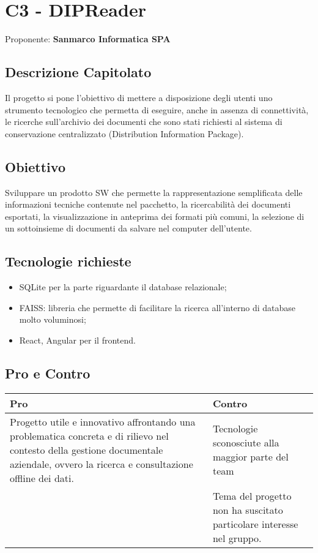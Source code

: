 \documentclass[a4paper,12pt]{article}
\begin{document}
\section{C3 - DIPReader}{
    Proponente: \textbf{Sanmarco Informatica SPA}
    \subsection*{Descrizione Capitolato}{
        Il progetto si pone l'obiettivo di mettere a disposizione degli utenti uno strumento tecnologico che permetta di eseguire, anche in assenza di connettività, le ricerche sull'archivio dei documenti che sono stati richiesti al sistema di conservazione centralizzato (Distribution Information Package).
    }

    \subsection*{Obiettivo}{
        Sviluppare un prodotto SW che permette la rappresentazione semplificata delle informazioni tecniche contenute nel pacchetto, la ricercabilità dei documenti esportati, la visualizzazione in anteprima dei formati più comuni, la selezione di un sottoinsieme di documenti da salvare nel computer dell'utente.
    }

    \subsection*{Tecnologie richieste}{
        \begin{itemize}
            \item SQLite per la parte riguardante il database relazionale;
            \item FAISS: libreria che permette di facilitare la ricerca all'interno di database molto voluminosi;
            \item React, Angular per il frontend.
        \end{itemize}

    }

    \subsection*{Pro e Contro}{

        \begin{center} 
            \begin{tabular}{|p{9cm}|p{5cm}|}
                \hline
                \textbf{Pro} & \textbf{Contro} \\
                \hline
                Progetto utile e innovativo affrontando una problematica concreta e di rilievo nel contesto della gestione documentale aziendale, ovvero la ricerca e consultazione offline dei dati.
 & Tecnologie sconosciute alla maggior parte del team\\
                \hline
                & Tema del progetto non ha suscitato particolare interesse nel gruppo.\\
                \hline
            \end{tabular}
        \end{center}

}}
\end{document}
